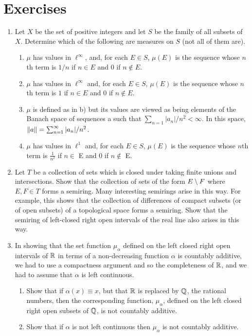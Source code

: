\section{Exercises}

\begin{enumerate}[label=\arabic*)]
\item Let $X$ be the set of positive integers and let $S$ be the family of all subsets of $X$. Determine which of the following are measures on $S$ (not all of them are).
\begin{enumerate}
\item $\mu$ has values in $\ell^\infty$, and, for each $E \in S$, $\mu(E)$ is the sequence whose $n$th term is $1 / n$ if $n \in E$ and 0 if $n \notin E$.
\item $\mu$ has values in $\ell^\infty$ and, for each $E \in S$, $\mu(E)$ is the sequence whose $n$th term is $1$ if $n \in E$ and $0$ if $n \notin E$.
\item $\mu$ is defined as in b) but its values are viewed as being elements of the Banach space of sequences a such that $\sum_{n=1}|a_n|/n^2<\infty$. In this space, $\norm{a}=\sum_{n=1}^\infty|a_n|/n^2$.
\item $\mu$ has values in $\ell^1$ and, for each $E \in {S}$, $\mu(E)$ is the sequence whose $n$th term is $\frac1{n^2}$ if $n \in$ E and $0$ if $n \notin$ E.
\end{enumerate}

\item Let $T$ be a collection of sets which is closed under taking finite unions and intersections. Show that the collection of sets of the form $E\setminus F$ where $E, F \in T$ forms a semiring. Many interesting semirings arise in this way. For example, this shows that the collection of differences of compact subsets (or of open subsets) of a topological space forms a semiring. Show that the semiring of left-closed right open intervals of the real line also arises in this way.

\item In showing that the set function $\mu_\alpha$ defined on the left closed right open intervals of $\mathbb{R}$ in terms of a non-decreasing function $\alpha$ is countably additive, we had to use a compactness argument and so the completeness of $\mathbb{R}$, and we had to assume that $\alpha$ is left continuous.

\begin{enumerate}
\item Show that if $\alpha(x) \equiv x$, but that $\mathbb{R}$ is replaced by $\mathbb{Q}$, the rational numbers, then the corresponding function, $\mu_\alpha$, defined on the left closed right open subsets of $\mathbb{Q}$, is not countably additive.
\item Show that if $\alpha$ is not left continuous then $\mu_\alpha$ is not countably additive.
\end{enumerate}


\end{enumerate}
